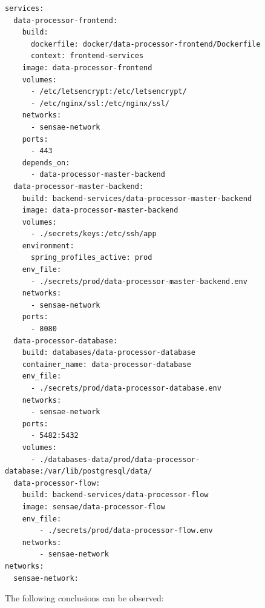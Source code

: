 \begin{lstlisting}[style=yaml, caption=Docker Compose Configuration File for Production, label={code:implementation:description:compose:file}]
services:
  data-processor-frontend:
    build:
      dockerfile: docker/data-processor-frontend/Dockerfile
      context: frontend-services
    image: data-processor-frontend
    volumes:
      - /etc/letsencrypt:/etc/letsencrypt/
      - /etc/nginx/ssl:/etc/nginx/ssl/
    networks:
      - sensae-network
    ports:
      - 443
    depends_on:
      - data-processor-master-backend
  data-processor-master-backend:
    build: backend-services/data-processor-master-backend
    image: data-processor-master-backend
    volumes:
      - ./secrets/keys:/etc/ssh/app
    environment:
      spring_profiles_active: prod
    env_file:
      - ./secrets/prod/data-processor-master-backend.env
    networks:
      - sensae-network
    ports:
      - 8080
  data-processor-database:
    build: databases/data-processor-database
    container_name: data-processor-database
    env_file:
      - ./secrets/prod/data-processor-database.env
    networks:
      - sensae-network
    ports:
      - 5482:5432
    volumes:
      - ./databases-data/prod/data-processor-database:/var/lib/postgresql/data/
  data-processor-flow:
    build: backend-services/data-processor-flow
    image: sensae/data-processor-flow
    env_file:
        - ./secrets/prod/data-processor-flow.env
    networks:
        - sensae-network
networks:
  sensae-network:
\end{lstlisting}

The following conclusions can be observed:

